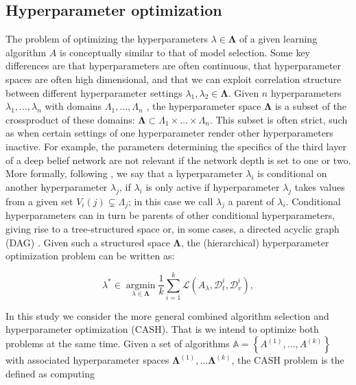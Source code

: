 \documentclass[journal]{IEEEtran}
\begin{document}
\subsection{Hyperparameter optimization}

The problem of optimizing the hyperparameters $\lambda \in \mathbf{\Lambda}$ of a given learning algorithm $A$ is conceptually similar to that of model selection. Some key differences are that hyperparameters are often continuous, that hyperparameter spaces are often high dimensional, and that we can exploit correlation structure between different hyperparameter settings $\lambda_1,\lambda_2 \in \mathbf{\Lambda} $. Given $n$ hyperparameters $\lambda_1, \ldots, \lambda_n$ with domains $\Lambda_1, \ldots, \Lambda_n$ , the hyperparameter space $\mathbf{\Lambda}$ is a subset of the crossproduct of these domains: $\mathbf{\Lambda} \subset \Lambda_1 \times \ldots \times \Lambda_n$. This subset is often strict, such as when certain settings of one hyperparameter render other hyperparameters inactive. For example, the parameters determining the specifics of the third layer of a deep belief network are not relevant if the network depth is set to one or two. More formally, following \cite{Hutter2009}, we say that a hyperparameter $\lambda_i$ is conditional on another hyperparameter $\lambda_j$, if $\lambda_i$ is only active if hyperparameter $\lambda_j$ takes values from a given set $V_i \left(j \right) \subsetneq \Lambda_j$; in this case we call $\lambda_j$ a parent of $\lambda_i$. Conditional hyperparameters can in turn be parents of other conditional hyperparameters, giving rise to a tree-structured space \cite{Bergstra2011} or, in some cases, a directed acyclic graph (DAG) \cite{Hutter2009}. Given such a structured space $\mathbf{\Lambda}$, the (hierarchical) hyperparameter optimization problem can be written as:

\begin{equation}
\lambda^* \in \underset{\lambda \in \mathbf{\Lambda}}{\operatorname{argmin}} \frac{1}{k} \sum_{i=1}^{k} \mathcal{L} \left( A_{\lambda}, \mathcal{D}^{i}_{t},  \mathcal{D}^{i}_{v} \right),
\end{equation}

In this study we consider the more general combined algorithm selection and hyperparameter optimization (CASH). That is we intend to optimize both problems at the same time. Given a set of algorithms $\mathbb{A} = \left\lbrace A^{(1)}, \ldots, A^{(k)} \right\rbrace$ with associated hyperparameter spaces $\mathbf{\Lambda}^{(1)}, \ldots \mathbf{\Lambda}^{(k)}$, the CASH problem is the defined as computing
\end{document}
